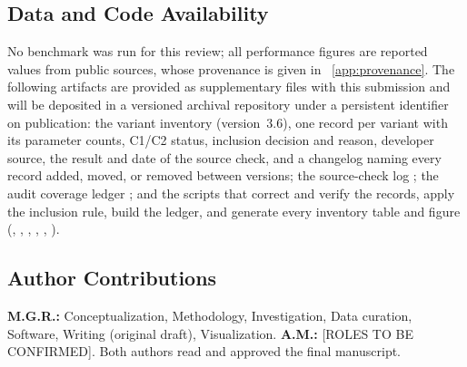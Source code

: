 \subsection*{Data and Code Availability}
No benchmark was run for this review; all performance figures are reported values from public sources, whose provenance is given in \suppsec~\ref{app:provenance}. The following artifacts are provided as supplementary files with this submission and will be deposited in a versioned archival repository under a persistent identifier on publication: the variant inventory  (version~3.6), one record per variant with its parameter counts, C1/C2 status, inclusion decision and reason, developer source, the result and date of the source check, and a changelog naming every record added, moved, or removed between versions; the source-check log ; the audit coverage ledger ; and the scripts that correct and verify the records, apply the inclusion rule, build the ledger, and generate every inventory table and figure (, , , , , ).

\subsection*{Author Contributions}
\textbf{M.G.R.:} Conceptualization, Methodology, Investigation, Data curation, Software, Writing (original draft), Visualization.
\textbf{A.M.:} [ROLES TO BE CONFIRMED].
Both authors read and approved the final manuscript.
